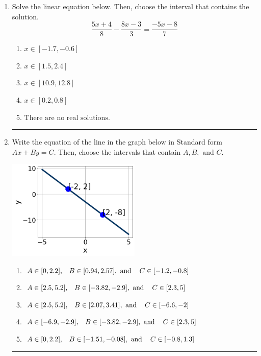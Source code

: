 \documentclass[14pt]{extbook}
\newcommand{\litem}[1]{\item#1\hspace*{-1cm}\rule{\textwidth}{0.4pt}}
\begin{document}
\begin{enumerate}
\litem{
Solve the linear equation below. Then, choose the interval that contains the solution.\[ \frac{5x + 4}{8} - \frac{8x -3}{3} = \frac{-5x -8}{7} \]\begin{enumerate}[label=\Alph*.]
\item \( x \in [-1.7, -0.6] \)
\item \( x \in [1.5, 2.4] \)
\item \( x \in [10.9, 12.8] \)
\item \( x \in [0.2, 0.8] \)
\item \( \text{There are no real solutions.} \)

\end{enumerate} }
\litem{
Write the equation of the line in the graph below in Standard form $Ax+By=C$. Then, choose the intervals that contain $A, B, \text{ and } C$.
\begin{center}
    \includegraphics[width=0.5\textwidth]{../Figures/linearGraphToStandardC.png}
\end{center}
\begin{enumerate}[label=\Alph*.]
\item \( A \in [0, 2.2], \hspace{3mm} B \in [0.94, 2.57], \text{ and } \hspace{3mm} C \in [-1.2, -0.8] \)
\item \( A \in [2.5, 5.2], \hspace{3mm} B \in [-3.82, -2.9], \text{ and } \hspace{3mm} C \in [2.3, 5] \)
\item \( A \in [2.5, 5.2], \hspace{3mm} B \in [2.07, 3.41], \text{ and } \hspace{3mm} C \in [-6.6, -2] \)
\item \( A \in [-6.9, -2.9], \hspace{3mm} B \in [-3.82, -2.9], \text{ and } \hspace{3mm} C \in [2.3, 5] \)
\item \( A \in [0, 2.2], \hspace{3mm} B \in [-1.51, -0.08], \text{ and } \hspace{3mm} C \in [-0.8, 1.3] \)


\end{enumerate}}
\end{enumerate}
\end{document}
